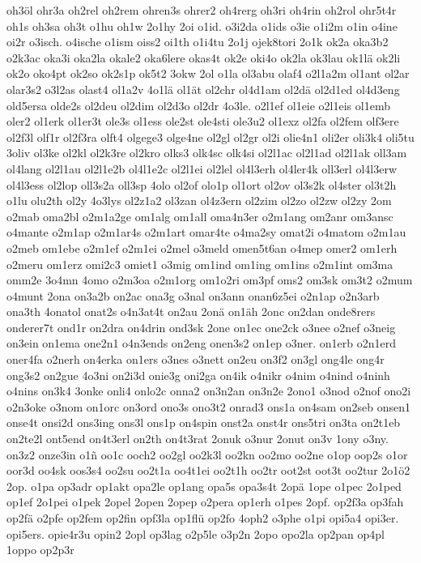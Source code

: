 {oh3öl
ohr3a
oh2rel
oh2rem
ohren3s
ohrer2
oh4rerg
oh3ri
oh4rin
oh2rol
ohr5t4r
oh1s
oh3sa
oh3t
o1hu
oh1w
2o1hy
2oi
o1id.
o3i2da
o1ids
o3ie
o1i2m
o1in
o4ine
oi2r
o3isch.
o4ische
o1ism
oiss2
oi1th
o1i4tu
2o1j
ojek8tori
2o1k
ok2a
oka3b2
o2k3ac
oka3i
oka2la
okale2
oka6lere
okas4t
ok2e
oki4o
ok2la
ok3lau
ok1lä
ok2li
ok2o
oko4pt
ok2so
ok2s1p
ok5t2
3okw
2ol
o1la
ol3abu
olaf4
o2l1a2m
ol1ant
ol2ar
olar3s2
o3l2as
olast4
ol1a2v
4o1lä
ol1ät
ol2chr
ol4d1am
ol2dä
ol2d1ed
ol4d3eng
old5ersa
olde2s
ol2deu
ol2dim
ol2d3o
ol2dr
4o3le.
o2l1ef
ol1eie
o2l1eis
ol1emb
oler2
ol1erk
ol1er3t
ole3s
ol1ess
ole2st
ole4sti
ole3u2
ol1exz
ol2fa
ol2fem
olf3ere
ol2f3l
olf1r
ol2f3ra
olft4
olgege3
olge4ne
ol2gl
ol2gr
ol2i
olie4n1
oli2er
oli3k4
oli5tu
3oliv
ol3ke
ol2kl
ol2k3re
ol2kro
olks3
olk4sc
olk4si
ol2l1ac
ol2l1ad
ol2l1ak
oll3am
ol4lang
ol2l1au
ol2l1e2b
ol4l1e2c
ol2l1ei
ol2lel
ol4l3erh
ol4ler4k
oll3erl
ol4l3erw
ol4l3ess
ol2lop
oll3s2a
oll3sp
4olo
ol2of
olo1p
ol1ort
ol2ov
ol3s2k
ol4ster
ol3t2h
o1lu
olu2th
ol2y
4o3lys
ol2z1a2
ol3zan
ol4z3ern
ol2zim
ol2zo
ol2zw
ol2zy
2om
o2mab
oma2bl
o2m1a2ge
om1alg
om1all
oma4n3er
o2m1ang
om2anr
om3ansc
o4mante
o2m1ap
o2m1ar4s
o2m1art
omar4te
o4ma2sy
omat2i
o4matom
o2m1au
o2meb
om1ebe
o2m1ef
o2m1ei
o2mel
o3meld
omen5t6an
o4mep
omer2
om1erh
o2meru
om1erz
omi2c3
omiet1
o3mig
om1ind
om1ing
om1ins
o2m1int
om3ma
omm2e
3o4mn
4omo
o2m3oa
o2m1org
om1o2ri
om3pf
oms2
om3sk
om3t2
o2mum
o4munt
2ona
on3a2b
on2ac
ona3g
o3nal
on3ann
onan6z5ei
o2n1ap
o2n3arb
ona3th
4onatol
onat2s
o4n3at4t
on2au
2onä
on1äh
2onc
on2dan
onde8rers
onderer7t
ond1r
on2dra
on4drin
ond3sk
2one
on1ec
one2ck
o3nee
o2nef
o3neig
on3ein
on1ema
one2n1
o4n3ends
on2eng
onen3s2
on1ep
o3ner.
on1erb
o2n1erd
oner4fa
o2nerh
on4erka
on1ers
o3nes
o3nett
on2eu
on3f2
on3gl
ong4le
ong4r
ong3s2
on2gue
4o3ni
on2i3d
onie3g
oni2ga
on4ik
o4nikr
o4nim
o4nind
o4ninh
o4nins
on3k4
3onke
onli4
onlo2c
onna2
on3n2an
on3n2e
2ono1
o3nod
o2nof
ono2i
o2n3oke
o3nom
on1orc
on3ord
ono3s
ono3t2
onrad3
ons1a
on4sam
on2seb
onsen1
onse4t
onsi2d
ons3ing
ons3l
ons1p
on4spin
onst2a
onst4r
ons5tri
on3ta
on2t1eb
on2te2l
ont5end
on4t3erl
on2th
on4t3rat
2onuk
o3nur
2onut
on3v
1ony
o3ny.
on3z2
onze3in
o1ñ
oo1c
ooch2
oo2gl
oo2k3l
oo2kn
oo2mo
oo2ne
o1op
oop2s
o1or
oor3d
oo4sk
oos3s4
oo2su
oo2t1a
oo4t1ei
oo2t1h
oo2tr
oot2st
oot3t
oo2tur
2o1ö2
2op.
o1pa
op3adr
op1akt
opa2le
op1ang
opa5s
opa3s4t
2opä
1ope
o1pec
2o1ped
op1ef
2o1pei
o1pek
2opel
2open
2opep
o2pera
op1erh
o1pes
2opf.
op2f3a
op3fah
op2fä
o2pfe
op2fem
op2fin
opf3la
op1flü
op2fo
4oph2
o3phe
o1pi
opi5a4
opi3er.
opi5ers.
opie4r3u
opin2
2opl
op3lag
o2p5le
o3p2n
2opo
opo2la
op2pan
op4pl
1oppo
op2p3r
}
